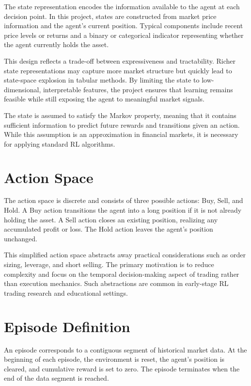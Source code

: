 \documentclass[12pt]{report}
\begin{document}
The state representation encodes the information available to the agent at each decision point. In this project, states are constructed from market price information and the agent’s current position. Typical components include recent price levels or returns and a binary or categorical indicator representing whether the agent currently holds the asset.

This design reflects a trade-off between expressiveness and tractability. Richer state representations may capture more market structure but quickly lead to state-space explosion in tabular methods. By limiting the state to low-dimensional, interpretable features, the project ensures that learning remains feasible while still exposing the agent to meaningful market signals.

The state is assumed to satisfy the Markov property, meaning that it contains sufficient information to predict future rewards and transitions given an action. While this assumption is an approximation in financial markets, it is necessary for applying standard RL algorithms.

\section{Action Space}

The action space is discrete and consists of three possible actions: Buy, Sell, and Hold. A Buy action transitions the agent into a long position if it is not already holding the asset. A Sell action closes an existing position, realizing any accumulated profit or loss. The Hold action leaves the agent’s position unchanged.

This simplified action space abstracts away practical considerations such as order sizing, leverage, and short selling. The primary motivation is to reduce complexity and focus on the temporal decision-making aspect of trading rather than execution mechanics. Such abstractions are common in early-stage RL trading research and educational settings.

\section{Episode Definition}

An episode corresponds to a contiguous segment of historical market data. At the beginning of each episode, the environment is reset, the agent’s position is cleared, and cumulative reward is set to zero. The episode terminates when the end of the data segment is reached.
\end{document}
